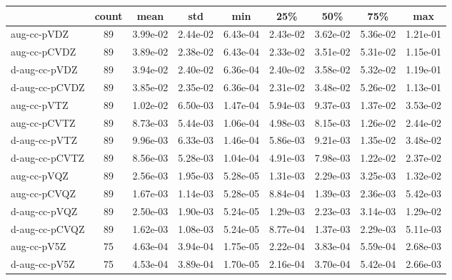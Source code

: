 \begin{tabular}{lSSSSSSSS}
\toprule
{} & {count} & {mean} & {std} & {min} & {25\%} & {50\%} & {75\%} & {max} \\
\midrule
aug-cc-pVDZ & 89 & 3.99e-02 & 2.44e-02 & 6.43e-04 & 2.43e-02 & 3.62e-02 & 5.36e-02 & 1.21e-01 \\
aug-cc-pCVDZ & 89 & 3.89e-02 & 2.38e-02 & 6.43e-04 & 2.33e-02 & 3.51e-02 & 5.31e-02 & 1.15e-01 \\
d-aug-cc-pVDZ & 89 & 3.94e-02 & 2.40e-02 & 6.36e-04 & 2.40e-02 & 3.58e-02 & 5.32e-02 & 1.19e-01 \\
d-aug-cc-pCVDZ & 89 & 3.85e-02 & 2.35e-02 & 6.36e-04 & 2.31e-02 & 3.48e-02 & 5.26e-02 & 1.13e-01 \\
aug-cc-pVTZ & 89 & 1.02e-02 & 6.50e-03 & 1.47e-04 & 5.94e-03 & 9.37e-03 & 1.37e-02 & 3.53e-02 \\
aug-cc-pCVTZ & 89 & 8.73e-03 & 5.44e-03 & 1.06e-04 & 4.98e-03 & 8.15e-03 & 1.26e-02 & 2.44e-02 \\
d-aug-cc-pVTZ & 89 & 9.96e-03 & 6.33e-03 & 1.46e-04 & 5.86e-03 & 9.21e-03 & 1.35e-02 & 3.48e-02 \\
d-aug-cc-pCVTZ & 89 & 8.56e-03 & 5.28e-03 & 1.04e-04 & 4.91e-03 & 7.98e-03 & 1.22e-02 & 2.37e-02 \\
aug-cc-pVQZ & 89 & 2.56e-03 & 1.95e-03 & 5.28e-05 & 1.31e-03 & 2.29e-03 & 3.25e-03 & 1.32e-02 \\
aug-cc-pCVQZ & 89 & 1.67e-03 & 1.14e-03 & 5.28e-05 & 8.84e-04 & 1.39e-03 & 2.36e-03 & 5.42e-03 \\
d-aug-cc-pVQZ & 89 & 2.50e-03 & 1.90e-03 & 5.24e-05 & 1.29e-03 & 2.23e-03 & 3.14e-03 & 1.29e-02 \\
d-aug-cc-pCVQZ & 89 & 1.62e-03 & 1.08e-03 & 5.24e-05 & 8.77e-04 & 1.37e-03 & 2.29e-03 & 5.11e-03 \\
aug-cc-pV5Z & 75 & 4.63e-04 & 3.94e-04 & 1.75e-05 & 2.22e-04 & 3.83e-04 & 5.59e-04 & 2.68e-03 \\
d-aug-cc-pV5Z & 75 & 4.53e-04 & 3.89e-04 & 1.70e-05 & 2.16e-04 & 3.70e-04 & 5.42e-04 & 2.66e-03 \\
\bottomrule
\end{tabular}
